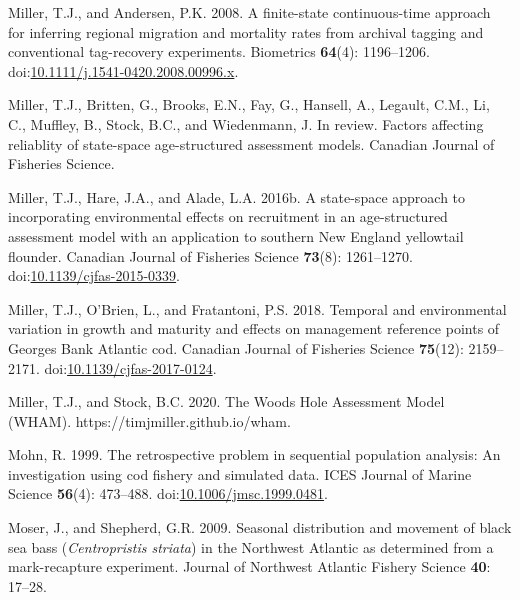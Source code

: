 \documentclass[
]{article}
\newlength{\cslhangindent}
\newlength{\cslentryspacingunit} %
\newenvironment{CSLReferences}[2] %
 {%
  \setlength{\parindent}{0pt}
  \ifodd #1
  \let\oldpar\par
  \def\par{\hangindent=\cslhangindent\oldpar}
  \fi
  \setlength{\parskip}{#2\cslentryspacingunit}
 }%
 {}
\begin{document}
\begin{CSLReferences}{1}{0}
\leavevmode{}%
Miller, T.J., and Andersen, P.K. 2008. A finite-state continuous-time approach for inferring regional migration and mortality rates from archival tagging and conventional tag-recovery experiments. Biometrics \textbf{64}(4): 1196--1206. doi:\href{https://doi.org/10.1111/j.1541-0420.2008.00996.x}{10.1111/j.1541-0420.2008.00996.x}.

\leavevmode{}%
Miller, T.J., Britten, G., Brooks, E.N., Fay, G., Hansell, A., Legault, C.M., Li, C., Muffley, B., Stock, B.C., and Wiedenmann, J. In review. Factors affecting reliablity of state-space age-structured assessment models. Canadian Journal of Fisheries Science.

\leavevmode{}%
Miller, T.J., Hare, J.A., and Alade, L.A. 2016b. A state-space approach to incorporating environmental effects on recruitment in an age-structured assessment model with an application to southern {New England} yellowtail flounder. Canadian Journal of Fisheries Science \textbf{73}(8): 1261--1270. doi:\href{https://doi.org/10.1139/cjfas-2015-0339}{10.1139/cjfas-2015-0339}.

\leavevmode{}%
Miller, T.J., O'Brien, L., and Fratantoni, P.S. 2018. Temporal and environmental variation in growth and maturity and effects on management reference points of {Georges Bank Atlantic} cod. Canadian Journal of Fisheries Science \textbf{75}(12): 2159--2171. doi:\href{https://doi.org/10.1139/cjfas-2017-0124}{10.1139/cjfas-2017-0124}.

\leavevmode{}%
Miller, T.J., and Stock, B.C. 2020. The {Woods Hole Assessment Model} ({WHAM}). https://timjmiller.github.io/wham.

\leavevmode{}%
Mohn, R. 1999. The retrospective problem in sequential population analysis: An investigation using cod fishery and simulated data. ICES Journal of Marine Science \textbf{56}(4): 473--488. doi:\href{https://doi.org/10.1006/jmsc.1999.0481}{10.1006/jmsc.1999.0481}.

\leavevmode{}%
Moser, J., and Shepherd, G.R. 2009. Seasonal distribution and movement of black sea bass (\emph{{C}entropristis striata}) in the {N}orthwest {A}tlantic as determined from a mark-recapture experiment. Journal of Northwest Atlantic Fishery Science \textbf{40}: 17--28.


\end{CSLReferences}
\end{document}

